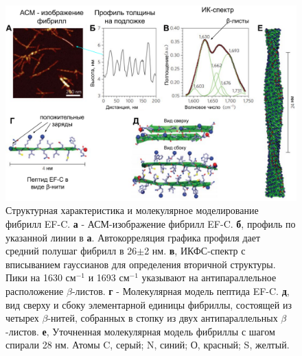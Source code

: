\begin{figure} [H]
    \centering
    \includegraphics[width=\textwidth]{images/p4/natnanotech2013/nn2013/nn2013_f2.pdf}
    \caption[Структурная характеристика и молекулярное моделирование фибрилл EF-C]{Структурная характеристика и молекулярное моделирование фибрилл EF-C. \textbf{а} - АСМ-изображение фибрилл EF-C. \textbf{б}, профиль по указанной линии в \textbf{а}. Автокорреляция графика профиля дает средний полушаг фибрилл в 26$\pm$2 нм. \textbf{в}, ИКФС-спектр с вписыванием гауссианов для определения вторичной структуры. Пики на 1630 $см^{-1}$ и 1693 $см^{-1}$ указывают на антипараллельное расположение $\beta$-листов. \textbf{г} - Молекулярная модель пептида EF-C. \textbf{д}, вид  сверху и сбоку элементарной единицы фибриллы, состоящей из четырех $\beta$-нитей, собранных в стопку из двух антипараллельных $\beta$-листов. \textbf{е}, Уточненная молекулярная модель фибриллы с шагом спирали 28 нм. Атомы C, серый; N, синий; О, красный; S, желтый.}
    \label{fig:p4_nn2013_f2}
\end{figure}
    
